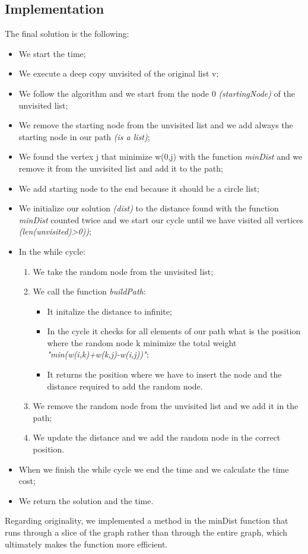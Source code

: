 \subsection{Implementation}
The final solution is the following:
\begin{itemize}
	\item We start the time;
	\item We execute a deep copy unvisited of the original list v;
	\item We follow the algorithm and we start from the node 0 \textit{(startingNode)} of the unvisited list;
	\item We remove the starting node from the unvisited list and we add always the starting node in our path \textit{(is a list)};
	\item We found the vertex j that minimize w(0,j) with the function \textit{minDist} and we remove it from the unvisited list and add it to the path;
	\item We add starting node to the end because it should be a circle list;
	\item We initialize our solution \textit{(dist)} to the distance found with the function \textit{minDist} counted twice and we start our cycle until we have visited all vertices \textit{(len(unvisited)>0))};
	\item In the while cycle:
	\begin{enumerate}
		\item We take the random node from the unvisited list;
		\item We call the function \textit{buildPath}:
		\begin{itemize}
			\item  It initalize the distance to infinite;
			\item  In the cycle it checks for all elements of our path what is the position where the random node k minimize the total weight \textit{"min(w(i,k)+w(k,j)-w(i,j))"};
			\item It returns the position where we have to insert the node and the distance required to add the random node.
		\end{itemize}
		\item We remove the random node from the unvisited list and we add it in the path;
		\item We update the distance and we add the random node in the correct position. 
	\end{enumerate}
	\item When we finish the while cycle we end the time and we calculate the time cost;
	\item We return the solution and the time.\\
\end{itemize}


Regarding originality, we implemented a method in the minDist function that runs through a slice of the graph rather than through the entire graph, which ultimately makes the function more efficient.




\pagebreak
